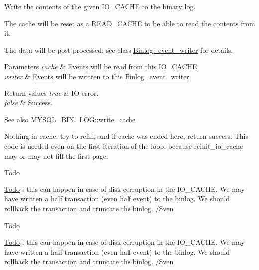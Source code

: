 Write the contents of the given I\+O\+\_\+\+C\+A\+C\+HE to the binary log.

The cache will be reset as a R\+E\+A\+D\+\_\+\+C\+A\+C\+HE to be able to read the contents from it.

The data will be post-\/processed\+: see class \mbox{\hyperlink{classBinlog__event__writer}{Binlog\+\_\+event\+\_\+writer}} for details.


\begin{DoxyParams}{Parameters}
{\em cache} & \mbox{\hyperlink{classEvents}{Events}} will be read from this I\+O\+\_\+\+C\+A\+C\+HE. \\
\hline
{\em writer} & \mbox{\hyperlink{classEvents}{Events}} will be written to this \mbox{\hyperlink{classBinlog__event__writer}{Binlog\+\_\+event\+\_\+writer}}.\\
\hline
\end{DoxyParams}

\begin{DoxyRetVals}{Return values}
{\em true} & IO error. \\
\hline
{\em false} & Success.\\
\hline
\end{DoxyRetVals}
\begin{DoxySeeAlso}{See also}
\mbox{\hyperlink{group__Binary__Log_gab0d497917a9a65893753ff92be180172}{M\+Y\+S\+Q\+L\+\_\+\+B\+I\+N\+\_\+\+L\+O\+G\+::write\+\_\+cache}} 
\end{DoxySeeAlso}
Nothing in cache\+: try to refill, and if cache was ended here, return success. This code is needed even on the first iteration of the loop, because reinit\+\_\+io\+\_\+cache may or may not fill the first page.

\begin{DoxyRefDesc}{Todo}
\item[\mbox{\hyperlink{todo__todo000006}{Todo}}]\+: this can happen in case of disk corruption in the I\+O\+\_\+\+C\+A\+C\+HE. We may have written a half transaction (even half event) to the binlog. We should rollback the transaction and truncate the binlog. /\+Sven \end{DoxyRefDesc}


\begin{DoxyRefDesc}{Todo}
\item[\mbox{\hyperlink{todo__todo000007}{Todo}}]\+: this can happen in case of disk corruption in the I\+O\+\_\+\+C\+A\+C\+HE. We may have written a half transaction (even half event) to the binlog. We should rollback the transaction and truncate the binlog. /\+Sven \end{DoxyRefDesc}
\mbox{\label{group__Binary__Log_ga80a5419e22b84b8ca2f3595cbf75fa67}} 
